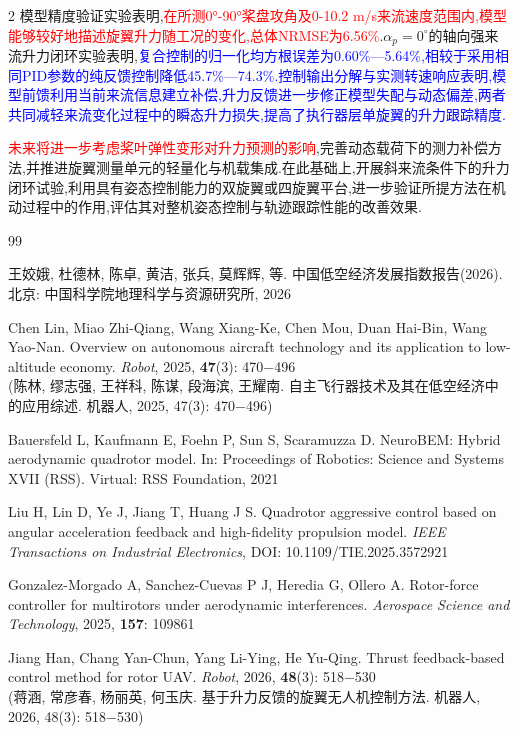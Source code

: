 \documentclass{aas}
\begin{document}
\begin{multicols}{2}
模型精度验证实验表明,\textcolor{red}{在所测0°-90°桨盘攻角及0-10.2 m/s来流速度范围内,模型能够较好地描述旋翼升力随工况的变化,总体NRMSE为6.56\%}.\textcolor{mygreen}{$\alpha_p=0^{\circ}$的轴向强来流升力闭环实验表明},\textcolor{blue}{复合控制的归一化均方根误差为0.60\%—5.64\%,相较于采用相同PID参数的纯反馈控制降低45.7\%—74.3\%.控制输出分解与实测转速响应表明,模型前馈利用当前来流信息建立补偿,升力反馈进一步修正模型失配与动态偏差,两者共同减轻来流变化过程中的瞬态升力损失,提高了执行器层单旋翼的升力跟踪精度.}

\textcolor{red}{未来将进一步考虑桨叶弹性变形对升力预测的影响},完善动态载荷下的测力补偿方法,并推进旋翼测量单元的轻量化与机载集成.在此基础上,开展斜来流条件下的升力闭环试验,利用具有姿态控制能力的双旋翼或四旋翼平台,进一步验证所提方法在机动过程中的作用,评估其对整机姿态控制与轨迹跟踪性能的改善效果.

\begin{thebibliography}{99}
 \addtolength{\itemsep}{0.2em} 

 王姣娥, 杜德林, 陈卓, 黄洁, 张兵, 莫辉辉, 等. 中国低空经济发展指数报告(2026). 北京: 中国科学院地理科学与资源研究所, 2026

 Chen Lin, Miao Zhi-Qiang, Wang Xiang-Ke, Chen Mou, Duan Hai-Bin, Wang Yao-Nan. Overview on autonomous aircraft technology and its application to low-altitude economy. {\sl Robot}, 2025, {\bf 47}(3): 470$-$496 \\
(陈林, 缪志强, 王祥科, 陈谋, 段海滨, 王耀南. 自主飞行器技术及其在低空经济中的应用综述. 机器人, 2025, 47(3): 470$-$496)

 Bauersfeld L, Kaufmann E, Foehn P, Sun S, Scaramuzza D. NeuroBEM: Hybrid aerodynamic quadrotor model. In: Proceedings of Robotics: Science and Systems XVII (RSS). Virtual: RSS Foundation, 2021

 Liu H, Lin D, Ye J, Jiang T, Huang J S. Quadrotor aggressive control based on angular acceleration feedback and high-fidelity propulsion model. {\sl IEEE Transactions on Industrial Electronics}, DOI: 10.1109/TIE.2025.3572921

 Gonzalez-Morgado A, Sanchez-Cuevas P J, Heredia G, Ollero A. Rotor-force controller for multirotors under aerodynamic interferences. {\sl Aerospace Science and Technology}, 2025, {\bf 157}: 109861

 Jiang Han, Chang Yan-Chun, Yang Li-Ying, He Yu-Qing. Thrust feedback-based control method for rotor UAV. {\sl Robot}, 2026, {\bf 48}(3): 518$-$530 \\
(蒋涵, 常彦春, 杨丽英, 何玉庆. 基于升力反馈的旋翼无人机控制方法. 机器人, 2026, 48(3): 518$-$530)


\end{thebibliography}
\end{multicols}
\end{document}
